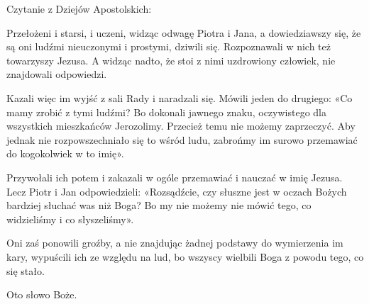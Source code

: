 \indent Czytanie z Dziejów Apostolskich:

Przełożeni i starsi, i uczeni, widząc odwagę Piotra i Jana, a dowiedziawszy się, że są oni ludźmi nieuczonymi i prostymi, dziwili się. Rozpoznawali w nich też towarzyszy Jezusa. A widząc nadto, że stoi z nimi uzdrowiony człowiek, nie znajdowali odpowiedzi.

Kazali więc im wyjść z sali Rady i naradzali się. Mówili jeden do drugiego: «Co mamy zrobić z tymi ludźmi? Bo dokonali jawnego znaku, oczywistego dla wszystkich mieszkańców Jerozolimy. Przecież temu nie możemy zaprzeczyć. Aby jednak nie rozpowszechniało się to wśród ludu, zabrońmy im surowo przemawiać do kogokolwiek w to imię».

Przywołali ich potem i zakazali w ogóle przemawiać i nauczać w imię Jezusa. Lecz Piotr i Jan odpowiedzieli: «Rozsądźcie, czy słuszne jest w oczach Bożych bardziej słuchać was niż Boga? Bo my nie możemy nie mówić tego, co widzieliśmy i co słyszeliśmy».

Oni zaś ponowili groźby, a nie znajdując żadnej podstawy do wymierzenia im kary, wypuścili ich ze względu na lud, bo wszyscy wielbili Boga z powodu tego, co się stało.

Oto słowo Boże.